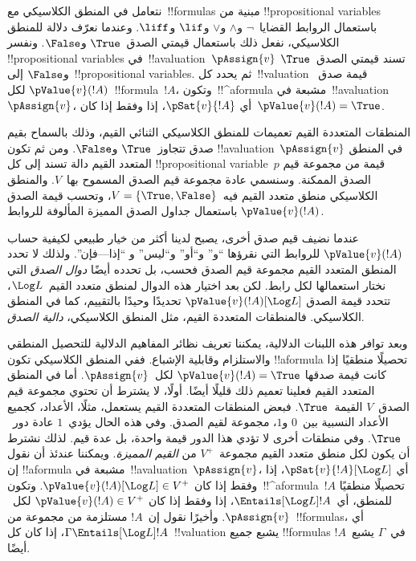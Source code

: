 \documentclass[../../../include/open-logic-section]{subfiles}
\begin{document}


نتعامل في المنطق الكلاسيكي مع~!!{formula}s مبنية من
!!{propositional variable}s باستعمال الروابط القضايا~$\lnot$ و$\land$
و$\lor$ و$\lif$ و$\liff$. وعندما نعرّف دلالة للمنطق الكلاسيكي، نفعل
ذلك باستعمال قيمتي الصدق~$\True$ و$\False$. ونفسر
!!{propositional variable}s في~!!a{valuation}~$\pAssign{v}$ تسند
قيمتي الصدق~$\True$ و$\False$ إلى~!!{propositional variable}s. ثم يحدد
كل~!!{valuation} قيمة صدق~$\pValue{v}(!A)$ لكل~!!{formula}~$!A$،
وتكون~!!^a{formula} مشبعة في~!!a{valuation}~$\pAssign{v}$، أي
$\pSat{v}{!A}$، إذا وفقط إذا كان~$\pValue{v}(!A) = \True$.

المنطقات المتعددة القيم تعميمات للمنطق الكلاسيكي الثنائي القيم، وذلك
بالسماح بقيم صدق تتجاوز~$\True$ و$\False$. ومن ثم تكون
!!a{valuation}~$\pAssign{v}$ في المنطق المتعدد القيم دالة تسند إلى كل
!!{propositional variable}~$p$ قيمة من مجموعة قيم الصدق الممكنة.
وسنسمي عادة مجموعة قيم الصدق المسموح بها~$V$. والمنطق الكلاسيكي منطق
متعدد القيم فيه~$V = \{\True, \False\}$، وتحسب قيمة الصدق
$\pValue{v}(!A)$ باستعمال جداول الصدق المميزة المألوفة للروابط.

عندما نضيف قيم صدق أخرى، يصبح لدينا أكثر من خيار طبيعي لكيفية حساب
$\pValue{v}(!A)$ للروابط التي نقرؤها ``و'' و``أو'' و``ليس'' و
``إذا---فإن''. ولذلك لا تحدد المنطق المتعدد القيم مجموعة قيم الصدق
فحسب، بل تحدده أيضًا \emph{دوال الصدق} التي نختار استعمالها لكل رابط.
لكن بعد اختيار هذه الدوال لمنطق متعدد القيم~$\Log L$، تتحدد قيمة الصدق
$\pValue{v}(!A)[\Log L]$ تحديدًا وحيدًا بالتقييم، كما في المنطق
الكلاسيكي. فالمنطقات المتعددة القيم، مثل المنطق الكلاسيكي،
\emph{دالية الصدق}.

وبعد توافر هذه اللبنات الدلالية، يمكننا تعريف نظائر المفاهيم الدلالية
للتحصيل المنطقي والاستلزام وقابلية الإشباع. ففي المنطق الكلاسيكي تكون
!!a{formula} تحصيلًا منطقيًا إذا كانت قيمة صدقها
$\pValue{v}(!A) = \True$ لكل~$\pAssign{v}$. أما في المنطق المتعدد
القيم فعلينا تعميم ذلك قليلًا أيضًا. أولًا، لا يشترط أن تحتوي مجموعة
قيم الصدق~$V$ القيمة~$\True$. فبعض المنطقات المتعددة القيم يستعمل،
مثلًا، الأعداد، كجميع الأعداد النسبية بين~$0$ و$1$، مجموعة لقيم الصدق.
وفي هذه الحال يؤدي~$1$ عادة دور~$\True$. وفي منطقات أخرى لا تؤدي هذا
الدور قيمة واحدة، بل عدة قيم. لذلك نشترط أن يكون لكل منطق متعدد القيم
مجموعة~$V^+$ من \emph{القيم المميزة}. ويمكننا عندئذ أن نقول إن
!!a{formula} مشبعة في~!!a{valuation}~$\pAssign{v}$، أي
$\pSat{v}{!A}[\Log L]$، إذا وفقط إذا كان
$\pValue{v}(!A)[\Log L] \in V^+$. وتكون~!!^a{formula}~$!A$ تحصيلًا
منطقيًا للمنطق، أي~$\Entails[\Log L] !A$، إذا وفقط إذا كان
$\pValue{v}(!A) \in V^+$ لكل~$\pAssign{v}$. وأخيرًا نقول إن~$!A$
مستلزمة من مجموعة من~!!{formula}s، أي
$\Gamma \Entails[\Log L] !A$، إذا كان كل~!!{valuation} يشبع جميع
!!{formula}s في~$\Gamma$ يشبع~$!A$ أيضًا.
\end{document}
